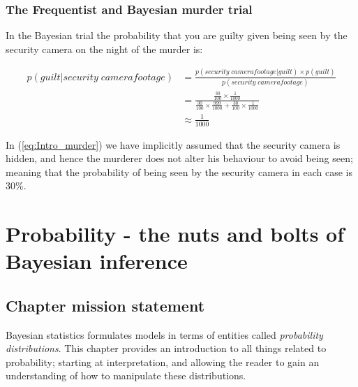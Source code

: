 \documentclass[11pt,fullpage]{book}
\begin{document}
\subsection{The Frequentist and Bayesian murder trial}\label{sec:Intro_appendixMurder}
In the Bayesian trial the probability that you are guilty given being seen by the security camera on the night of the murder is:

\begin{equation}\label{eq:Intro_murder}
\begin{align}
p(guilt|security\; camera footage) &= \frac{p(security\; camera footage|guilt)\times p(guilt)}{p(security\; camera footage)}\\
&= \frac{\frac{30}{100}\times \frac{1}{1000}}{\frac{30}{100}\times \frac{999}{1000}+\frac{30}{100}\times \frac{1}{1000}}\\
&\approx \frac{1}{1000}
\end{align}
\end{equation}

In (\ref{eq:Intro_murder}) we have implicitly assumed that the security camera is hidden, and hence the murderer does not alter his behaviour to avoid being seen; meaning that the probability of being seen by the security camera in each case is 30\%. 

\chapter{Probability - the nuts and bolts of Bayesian inference}\label{chap:Probability}
\section{Chapter mission statement}
Bayesian statistics formulates models in terms of entities called \textit{probability distributions}. This chapter provides an introduction to all things related to probability; starting at interpretation, and allowing the reader to gain an understanding of how to manipulate these distributions.
\end{document}
